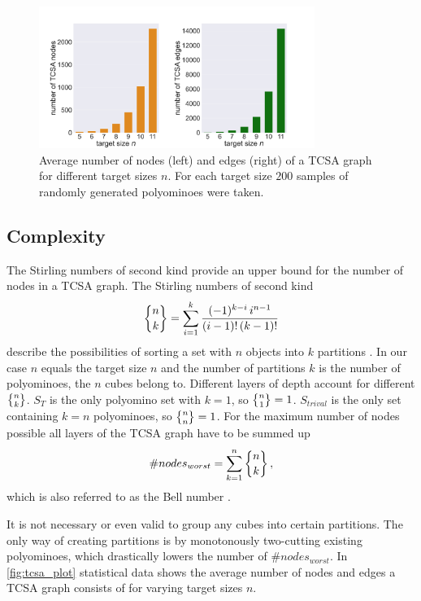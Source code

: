 \begin{figure}
	\centering
	\includegraphics[width=0.8\textwidth]{figures/plots/tcsa_nodes_edges.pdf}
	\caption[Average two-cut-sub-assembly nodes and edges for target size $n$.]{Average number of nodes (left) and edges (right) of a TCSA graph for different target sizes $n$.
	For each target size $200$ samples of randomly generated polyominoes were taken.}
	\label{fig:tcsa_plot}
\end{figure}

\subsection{Complexity}

The Stirling numbers of second kind provide an upper bound for the number of nodes in a TCSA graph.
The Stirling numbers of second kind
\begin{equation}
\bracenom{n}{k} = \sum_{i=1}^{k} \frac{(-1)^{k-i} \, i^{n-1}}{(i-1)! \, (k-1)!}
\end{equation}
describe the possibilities of sorting a set with $n$ objects into $k$ partitions \cite{jelliss1991}.
In our case $n$ equals the target size $n$ and the number of partitions $k$ is the number of polyominoes, the $n$ cubes belong to.
Different layers of depth account for different $\bracenom{n}{k}$.
$S_T$ is the only polyomino set with $k=1$, so $\bracenom{n}{1} = 1$.
$S_{trival}$ is the only set containing $k=n$ polyominoes, so $\bracenom{n}{n} = 1$.
For the maximum number of nodes possible all layers of the TCSA graph have to be summed up
\begin{equation}
\#nodes_{worst} = \sum_{k=1}^{n} \bracenom{n}{k} \, ,
\end{equation}
which is also referred to as the Bell number \cite{jelliss1991}.

It is not necessary or even valid to group any cubes into certain partitions.
The only way of creating partitions is by monotonously two-cutting existing polyominoes, which drastically lowers the number of $\#nodes_{worst}$.
In \autoref{fig:tcsa_plot} statistical data shows the average number of nodes and edges a TCSA graph consists of for varying target sizes $n$.

